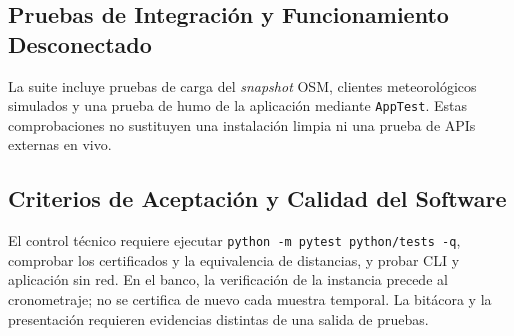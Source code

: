 \subsection{Pruebas de Integración y Funcionamiento Desconectado}
La suite incluye pruebas de carga del \textit{snapshot} OSM, clientes meteorológicos simulados y una prueba de humo de la aplicación mediante \texttt{AppTest}. Estas comprobaciones no sustituyen una instalación limpia ni una prueba de APIs externas en vivo.

\subsection{Criterios de Aceptación y Calidad del Software}
El control técnico requiere ejecutar \texttt{python -m pytest python/tests -q}, comprobar los certificados y la equivalencia de distancias, y probar CLI y aplicación sin red. En el banco, la verificación de la instancia precede al cronometraje; no se certifica de nuevo cada muestra temporal. La bitácora y la presentación requieren evidencias distintas de una salida de pruebas.
